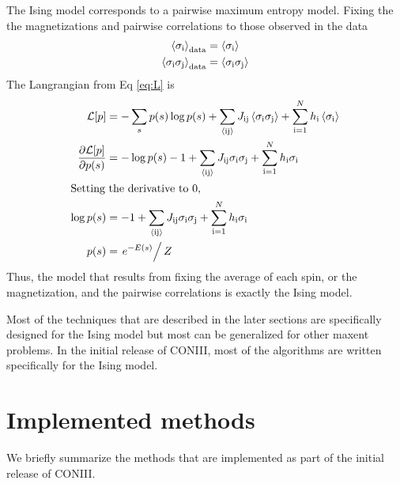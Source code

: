 \documentclass[aps,prl,twocolumn]{revtex4-1}
\begin{document}
The Ising model corresponds to a pairwise maximum entropy model.
Fixing the the magnetizations and pairwise correlations to those observed in the data
\begin{align}
	\left<\sigma_{\rm i}\right>_{\rm data} &= \left<\sigma_{\rm i}\right>\\
	\left<\sigma_{\rm i}\sigma_{\rm j}\right>_{\rm data} &= \left<\sigma_{\rm i}\sigma_{\rm j}\right>
\end{align}
The Langrangian from Eq \ref{eq:L} is
\begin{align}
	\mathcal{L}[p] &= -\sum_s p(s)\log p(s) +\sum_{\rm \left<ij\right>} J_{\rm ij}\left<\sigma_{\rm i}\sigma_{\rm j}\right> +\sum_{\rm i=1}^Nh_{\rm i}\left<\sigma_{\rm i}\right>\\
	\frac{\partial\mathcal{L}[p]}{\partial p(s)} &= -\log p(s)-1 +\sum_{\rm \left<ij\right>} J_{\rm ij}\sigma_{\rm i}\sigma_{\rm j} +\sum_{\rm i=1}^Nh_{\rm i}\sigma_{\rm i}\\
\intertext{Setting the derivative to 0,}
	\log p(s) &= -1 +\sum_{\rm \left<ij\right>} J_{\rm ij}\sigma_{\rm i}\sigma_{\rm j} +\sum_{\rm i=1}^Nh_{\rm i}\sigma_{\rm i}\\
	p(s) &= \left.e^{-E(s)}\right/Z
\end{align}
Thus, the model that results from fixing the average of each spin, or the magnetization, and the pairwise correlations is exactly the Ising model.

Most of the techniques that are described in the later sections are specifically designed for the Ising model but most can be generalized for other maxent problems. In the initial release of CONIII, most of the algorithms are written specifically for the Ising model.



\section{Implemented methods}
We briefly summarize the methods that are implemented as part of the initial release of CONIII.
\end{document}

